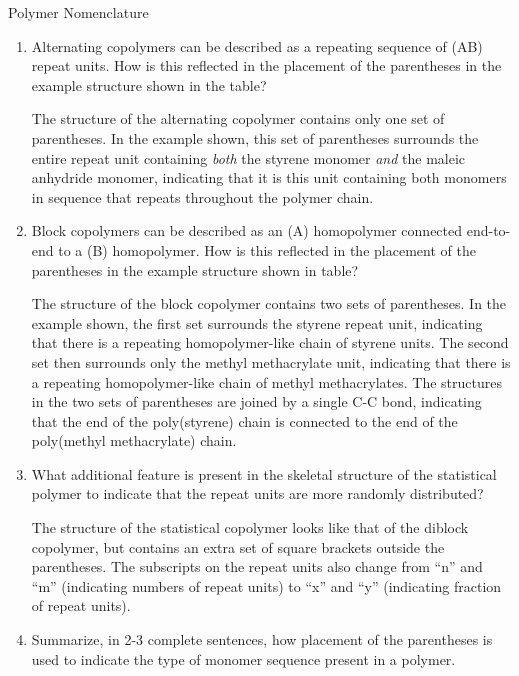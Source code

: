 \begin{activity}{Polymer Nomenclature}
\begin{ctqs}
\begin{enumerate}
			\item Alternating copolymers can be described as a repeating sequence of (AB) repeat units.  How is this reflected in the placement of the parentheses in the example structure shown in the table?
			
				\begin{solution}[1in]
				The structure of the alternating copolymer contains only one set of parentheses.  In the example shown, this set of parentheses surrounds the entire repeat unit containing \emph{both} the styrene monomer \emph{and} the maleic anhydride monomer, indicating that it is this unit containing both monomers in sequence that repeats throughout the polymer chain.
				\end{solution}
			
			\item Block copolymers can be described as an (A) homopolymer connected end-to-end to a (B) homopolymer.  How is this reflected in the placement of the parentheses in the example structure shown in table?  
			
				\begin{solution}[1in]
				The structure of the block copolymer contains two sets of parentheses.  In the example shown, the first set surrounds the styrene repeat unit, indicating that there is a repeating homopolymer-like chain of styrene units.  The second set then surrounds only the methyl methacrylate unit, indicating that there is a repeating homopolymer-like chain of methyl methacrylates.  The structures in the two sets of parentheses are joined by a single C-C bond, indicating that the end of the poly(styrene) chain is connected to the end of the poly(methyl methacrylate) chain.
				\end{solution}

			\item What additional feature is present in the skeletal structure of the statistical polymer to indicate that the repeat units are more randomly distributed?
			
				\begin{solution}[1in]
				The structure of the statistical copolymer looks like that of the diblock copolymer, but contains an extra set of square brackets outside the parentheses.  The subscripts on the repeat units also change from ``n'' and ``m'' (indicating numbers of repeat units) to ``x'' and ``y'' (indicating fraction of repeat units).
				\end{solution}
			
			\item Summarize, in 2-3 complete sentences, how placement of the parentheses is used to indicate the type of monomer sequence present in a polymer.
			

\end{enumerate}
\end{ctqs}
\end{activity}
